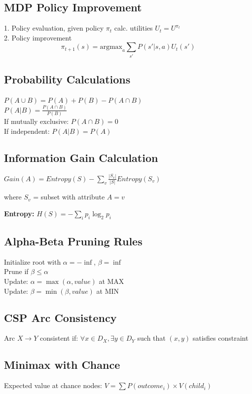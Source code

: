 \documentclass[8pt,landscape,a4paper]{article}
\begin{document}
\begin{multicols*}{3}
\subsection{MDP Policy Improvement}
1. Policy evaluation, given policy $\pi_t$ calc. utilities $U_t=U^{\pi_t}$\\
2. Policy improvement $$\pi_{t+1}(s)=\textrm{argmax}_a\sum_{s'}P(s'|s,a)U_t(s')$$


\subsection{Probability Calculations}
$P(A \cup B) = P(A) + P(B) - P(A \cap B)$\\
$P(A|B) = \frac{P(A \cap B)}{P(B)}$\\
If mutually exclusive: $P(A \cap B) = 0$\\
If independent: $P(A|B) = P(A)$

\subsection{Information Gain Calculation}
$Gain(A) = Entropy(S) - \sum_{v} \frac{|S_v|}{|S|} Entropy(S_v)$

where $S_v$ = subset with attribute $A = v$

\textbf{Entropy:} $H(S) = -\sum_i p_i \log_2 p_i$

\subsection{Alpha-Beta Pruning Rules}
Initialize root with $\alpha=-\inf$, $\beta=\inf$\\
Prune if $\beta \leq \alpha$ \\
Update: $\alpha = \max(\alpha, value)$ at MAX\\
Update: $\beta = \min(\beta, value)$ at MIN

\subsection{CSP Arc Consistency}
Arc $X \rightarrow Y$ consistent if:
$\forall x \in D_X, \exists y \in D_Y$ such that $(x,y)$ satisfies constraint

\subsection{Minimax with Chance}
Expected value at chance nodes:
$V = \sum P(outcome_i) \times V(child_i)$


\end{multicols*}
\end{document}
